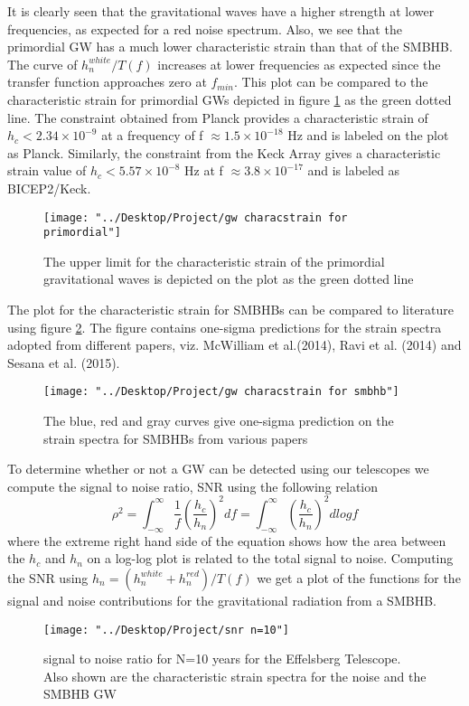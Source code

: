 \documentclass[12pt]{article}
\begin{document}
	It is clearly seen that the gravitational waves have a higher strength at lower frequencies, as expected for a red noise spectrum. Also, we see that the primordial GW has a much lower characteristic strain than that of the SMBHB. The curve of $h_{n}^{white}/T(f)$ increases at lower frequencies as expected since the transfer function approaches zero at $f_{min}$. This plot can be compared to the characteristic strain for primordial GWs depicted in figure \ref{fig:gw_spectrum_for_primordial.png} as the green dotted line. The constraint obtained from Planck provides a characteristic strain of $h_{c}<2.34 \times 10^{-9}$ at a frequency of f $ \approx 1.5 \times 10^{-18}$ Hz and is labeled on the plot as Planck. Similarly, the constraint from the Keck Array gives a characteristic strain value of $h_{c}<5.57 \times 10^{-8}$ Hz at f $\approx 3.8 \times 10^{-17}$ and is labeled as BICEP2/Keck.
\begin{figure}[th!]
	\texttt{[image: "../Desktop/Project/gw characstrain for primordial"]}
	\caption{\label{fig:gw_spectrum_for_primordial.png} The upper limit for the characteristic strain of the primordial gravitational waves is depicted on the plot as the green dotted line \cite{kuroda2015gravitational}}
\end{figure}
	The plot for the characteristic strain for SMBHBs can be compared to literature using figure \ref{fig:gw_characstrain_for_smbhb.png}. The figure contains one-sigma predictions for the strain spectra adopted from different papers, viz. McWilliam et al.(2014), Ravi et al. (2014) and Sesana et al. (2015). 
\begin{figure}[th!]
	\texttt{[image: "../Desktop/Project/gw characstrain for smbhb"]}
	\caption{\label{fig:gw_characstrain_for_smbhb.png} The blue, red and gray curves give one-sigma prediction on the strain spectra for SMBHBs from various papers \cite{arzoumanian2016nanograv}}
\end{figure}
	To determine whether or not a GW can be detected using our telescopes we compute the signal to noise ratio, SNR using the following relation 
	\begin{equation}\label{snr eqn}
	\rho^2=\int_{-\infty}^{\infty}\frac{1}{f}{(\frac{h_c}{h_n})^2}df=\int_{-\infty}^{\infty}{(\frac{h_c}{h_n})^2}dlogf
	\end{equation}
	where the extreme right hand side of the equation shows how the area between the $h_c$ and $h_n$ on a log-log plot is related to the total signal to noise. Computing the SNR using $h_n=(h_n^{white}+h_n^{red})/T(f)$ we get a plot of the functions for the signal and noise contributions for the gravitational radiation from a SMBHB.
\begin{figure}[th!]
	\texttt{[image: "../Desktop/Project/snr n=10"]}
	\caption{\label{fig:snr_n_10.png} signal to noise ratio for N=10 years for the Effelsberg Telescope. Also shown are the characteristic strain spectra for the noise and the SMBHB GW}
\end{figure}	
	
\end{document}
